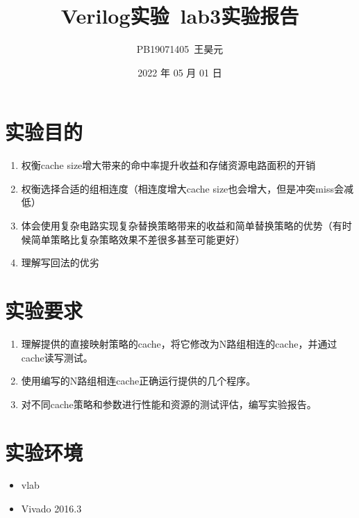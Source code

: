 \documentclass[UTF8]{article}
\title{Verilog实验\ lab3实验报告}
\author{PB19071405\ 王昊元}
\date{2022 年 05 月 01 日}
\begin{document}
    \maketitle

    \section{实验目的}
    \begin{enumerate}
        \item 权衡cache size增大带来的命中率提升收益和存储资源电路面积的开销
        \item 权衡选择合适的组相连度（相连度增大cache size也会增大，但是冲突miss会减低）
        \item 体会使用复杂电路实现复杂替换策略带来的收益和简单替换策略的优势（有时候简单策略比复杂策略效果不差很多甚至可能更好）
        \item 理解写回法的优劣
    \end{enumerate}
    \section{实验要求}
    \begin{enumerate}
        \item 理解提供的直接映射策略的cache，将它修改为N路组相连的cache，并通过cache读写测试。
        \item 使用编写的N路组相连cache正确运行提供的几个程序。
        \item 对不同cache策略和参数进行性能和资源的测试评估，编写实验报告。
    \end{enumerate}
    \section{实验环境}
    \begin{itemize}
        \item vlab
        \item Vivado 2016.3
    \end{itemize}
\end{document}
